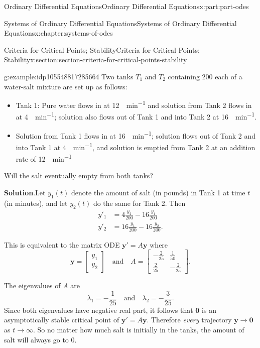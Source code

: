 \documentclass[twoside,10pt,]{book}
\newcommand{\blocktitlefont}{\relax}
\numberwithin{equation}{part}
\renewcommand{\vec}[1]{\mathbf{#1}}
\newcommand{\amp}{&}
\begin{document}
\begin{partptx}{Ordinary Differential Equations}{}{Ordinary Differential Equations}{}{}{x:part:part-odes}
\begin{chapterptx}{Systems of Ordinary Differential Equations}{}{Systems of Ordinary Differential Equations}{}{}{x:chapter:systems-of-odes}
\begin{sectionptx}{Criteria for Critical Points; Stability}{}{Criteria for Critical Points; Stability}{}{}{x:section:section-criteria-for-critical-points-stability}
\begin{example}{}{g:example:idp105548817285664}%
Two tanks \(T_{1}\) and \(T_{2}\) containing \SI{200}{\gallon} each of a water-salt mixture are set up as follows:%
%
\begin{itemize}[label=\textbullet]
\item{}Tank 1: Pure water flows in at \SI{12}{\gallon\per\minute} and solution from Tank 2 flows in at \SI{4}{\gallon\per\minute}; solution also flows out of Tank 1 and into Tank 2 at \SI{16}{\gallon\per\minute}.%
\item{}Solution from Tank 1 flows in at \SI{16}{\gallon\per\minute}; solution flows out of Tank 2 and into Tank 1 at \SI{4}{\gallon\per\minute}, and solution is emptied from Tank 2 at an addition rate of \SI{12}{\gallon\per\minute}%
\end{itemize}
Will the salt eventually empty from both tanks?%
\par\smallskip%
\noindent\textbf{\blocktitlefont Solution}.\hypertarget{g:solution:idp105548817262752}{}\quad{}Let \(y_{1}(t)\) denote the amount of salt (in pounds) in Tank 1 at time \(t\) (in minutes), and let \(y_{2}(t)\) do the same for Tank 2. Then%
\begin{align*}
y'_{1}  \amp =  4\frac{y_{2}}{200} - 16\frac{y_{1}}{200}\\
y'_{2}  \amp =  16\frac{y_{1}}{200} - 16\frac{y_{2}}{200}\text{.}
\end{align*}
%
\par
This is equivalent to the matrix ODE \(\vec{y}' = A\vec{y}\) where%
\begin{equation*}
\vec{y} = \begin{bmatrix}y_{1}\\y_{2}\end{bmatrix}\quad\text{and}\quad A = \begin{bmatrix}-\frac{2}{25} \amp  \frac{1}{50} \\ \frac{2}{25} \amp  -\frac{2}{25}\end{bmatrix}.
\end{equation*}
%
\par
The eigenvalues of \(A\) are%
\begin{equation*}
\lambda_{1} = -\frac{1}{25}\quad\text{and}\quad\lambda_{2} = -\frac{3}{25}.
\end{equation*}
Since both eigenvalues have negative real part, it follows that \(\vec{0}\) is an asymptotically stable critical point of \(\vec{y}'=A\vec{y}\). Therefore \emph{every} trajectory \(\vec{y}\to\vec{0}\) as \(t\to\infty\). So no matter how much salt is initially in the tanks, the amount of salt will always go to \(0\).%

\end{example}
\end{sectionptx}
\end{chapterptx}
\end{partptx}
\end{document}
